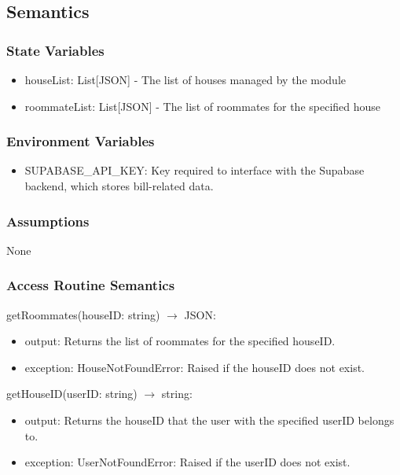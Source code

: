 \documentclass[12pt, titlepage]{article}
\begin{document}
\subsection{Semantics}

\subsubsection{State Variables}
\begin{itemize}
  \item houseList: List[JSON] - The list of houses managed by the module
  \item roommateList: List[JSON] - The list of roommates for the specified house
\end{itemize}

\subsubsection{Environment Variables}

\begin{itemize}
  \item SUPABASE{\_}API{\_}KEY: Key required to interface with the Supabase backend, which stores bill-related data.
  \end{itemize}
  

\subsubsection{Assumptions}
None

\subsubsection{Access Routine Semantics}

\noindent getRoommates(houseID: string) $\rightarrow$ JSON:
\begin{itemize}
\item output: Returns the list of roommates for the specified houseID.
\item exception: HouseNotFoundError: Raised if the houseID does not exist.
\end{itemize}

\noindent getHouseID(userID: string) $\rightarrow$ string:
\begin{itemize}
\item output: Returns the houseID that the user with the specified userID belongs to.
\item exception: UserNotFoundError: Raised if the userID does not exist.
\end{itemize}
\end{document}
